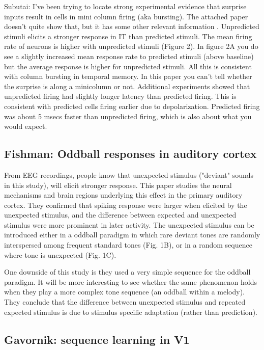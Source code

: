 \documentclass{article} %
\begin{document}
Subutai: I've been trying to locate strong experimental evidence that surprise
inputs result in cells in mini column firing (aka bursting).  The attached paper
doesn't quite show that, but it has some other relevant information
\cite{Meyer2011}.  Unpredicted stimuli elicits a stronger response in IT than
predicted stimuli. The mean firing rate of neurons is higher with unpredicted
stimuli (Figure 2). In figure 2A you do see a slightly increased mean response
rate to predicted stimuli (above baseline) but the average response is higher
for unpredicted stimuli. All this is consistent with column bursting in temporal
memory. In this paper you can't tell whether the surprise is along a minicolumn
or not. Additional experiments showed that unpredicted firing had slightly
longer latency than predicted firing. This is consistent with predicted cells
firing earlier due to depolarization. Predicted firing was about 5 msecs faster
than unpredicted firing, which is also about what you would expect.

\subsection{Fishman: Oddball responses in auditory cortex}
 
From EEG recordings, people know that unexpected stimulus ("deviant" sounds in
this study), will elicit stronger response. This paper \cite{Fishman2012}
studies the neural mechanisms and brain regions underlying this effect in the
primary auditory cortex. They confirmed that spiking response were larger when
elicited by the unexpected stimulus, and the difference between expected and
unexpected stimulus were more prominent in later activity. The unexpected
stimulus can be introduced either in a oddball paradigm in which rare deviant
tones are randomly interspersed among frequent standard tones (Fig. 1B), or in
a random sequence where tone is unexpected (Fig. 1C).

One downside of this study is they used a very simple sequence for the oddball
paradigm. It will be more interesting to see whether the same phenomenon holds
when they play a more complex tone sequence (an oddball within a melody). They
conclude that the difference between unexpected stimulus and repeated expected
stimulus is due to stimulus specific adaptation (rather than prediction).

\subsection{Gavornik: sequence learning in V1}
\end{document}
